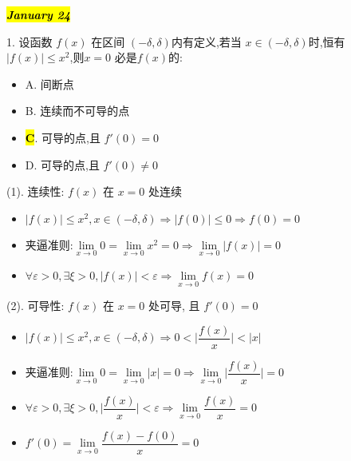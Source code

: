 \hl{\textbf{\textit{January 24}}}

1. 设函数 $f(x)$ 在区间 $(-\delta,\delta)$内有定义,若当 $x\in(-\delta,\delta)$时,恒有$|f(x)|\leq x^{2}$,则$x=0$ 必是$f(x)$的:
\begin{itemize}
	\item A. 间断点
	\item B. 连续而不可导的点
	\item \hl{\textbf{C}}. 可导的点,且 $f'(0)=0$
	\item D. 可导的点,且 $f'(0)\neq 0$
\end{itemize}
\begin{solution}

	(1). 连续性: $f(x)$ 在 $x = 0$ 处连续
	\begin{itemize}
		\item $|f(x)|\leq x^{2}, x\in (-\delta,\delta)\Rightarrow |f(0)|\leq 0\Rightarrow f(0) = 0$
		\item 夹逼准则:$\lim\limits_{x\to 0} 0 = \lim\limits_{x\to 0}x^{2} = 0\Rightarrow \lim\limits_{x\to 0} |f(x)| = 0$
		\item $\forall \varepsilon > 0 ,\exists \xi > 0, |f(x)| < \varepsilon \Rightarrow  \lim\limits_{x\to 0} f(x) = 0$
	\end{itemize}

	(2). 可导性: $f(x)$ 在 $x = 0$ 处可导, 且 $f'(0) = 0$
	\begin{itemize}
		\item $|f(x)|\leq x^{2}, x\in (-\delta,\delta)\Rightarrow 0 < \big|\dfrac{f(x)}{x}\big| < |x|$
		\item 夹逼准则:$\lim\limits_{x\to 0} 0 = \lim\limits_{x\to 0}|x| = 0\Rightarrow \lim\limits_{x\to 0} \big|\dfrac{f(x)}{x}\big| = 0$
		\item $\forall \varepsilon > 0 ,\exists \xi > 0, \big|\dfrac{f(x)}{x}\big| < \varepsilon \Rightarrow  \lim\limits_{x\to 0} \dfrac{f(x)}{x} = 0$
		\item $f'(0) = \lim\limits_{x\to 0} \dfrac{f(x)-f(0)}{x} = 0$
	\end{itemize}
\end{solution}

